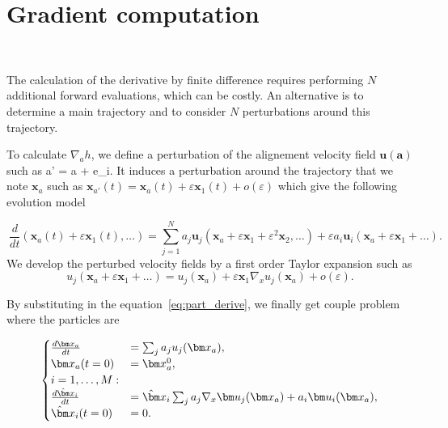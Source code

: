 \section{Gradient computation}~\label{ap:gradient}

The calculation of the derivative by finite difference requires performing $N$ additional forward evaluations, which can be costly. An alternative is to determine a main trajectory and to consider
$N$ perturbations around this trajectory.

To calculate $\nabla_a h$, we define a perturbation of the alignement velocity field $\bm u(\bm a)$ such as \bm a' = \bm a + \varepsilon \bm e_i. It induces a perturbation around the trajectory that we note $\bm x_a$ such as $\bm x_{a'}(t) = \bm x_a(t) + \varepsilon \bm x_1(t) + o(\varepsilon)$ which give the following evolution model

\begin{equation}~\label{eq:part_derive}
    \frac{d}{dt}(\bm x_a(t) + \varepsilon \bm x_1(t), \dots) = \sum_{j = 1}^N  a_j \bm u_j(\bm x_a + \varepsilon \bm x_1 + \varepsilon^2 \bm x_2, \dots) + \varepsilon a_i \bm u_i (\bm x_a + \varepsilon \bm x_1 + \dots).
\end{equation}We develop the perturbed velocity fields by a first order Taylor expansion such as
\begin{equation*}
    u_j(\bm x_a + \varepsilon \bm x_1 +\dots) = u_j(\bm x_a) + \varepsilon \bm x_1 \nabla_x u_j (\bm x_a) + o(\varepsilon).
\end{equation*}

By substituting in the equation~\eqref{eq:part_derive}, we finally get couple problem where the particles are

\begin{equation*}
    \begin{cases}
        \frac{d\bm x_a}{dt}      & =  \sum_j a_j u_j(\bm x_a),                                                   \\
        \bm x_a(t=0)             & =  \bm x_a^0,                                                                 \\
        i = 1, \dots, M:                                                                                         \\
        \frac{d\hat \bm x_i}{dt} & =  \hat \bm x_i \sum_j a_j  \nabla_x \bm u_j(\bm x_a) + a_i \bm u_i(\bm x_a), \\
        \hat \bm x_i(t=0)        & =  0.
    \end{cases}
\end{equation*}


